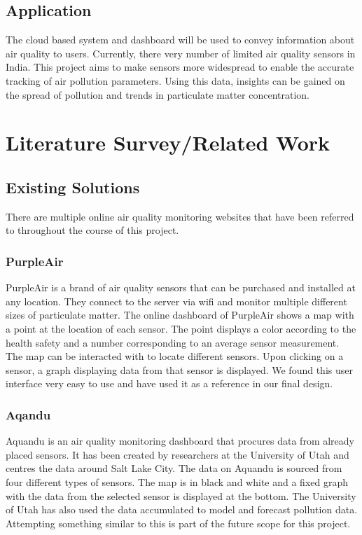 \documentclass[]{report}
\begin{document}
\section{Application}
The cloud based system and dashboard will be used to convey information about air quality to users. Currently, there very number of limited air quality sensors in India. This project aims to make sensors more widespread to enable the accurate tracking of air pollution parameters. Using this data, insights can be gained on the spread of pollution and trends in particulate matter concentration.

 

\chapter{Literature Survey/Related Work} 

\section{Existing Solutions}
There are multiple online air quality monitoring websites that have been referred to throughout the course of this project.

\subsection{PurpleAir}
PurpleAir\cite{purpleair} is a brand of air quality sensors that can be purchased and installed at any location. They connect to the server via wifi and monitor multiple different sizes of particulate matter. The online dashboard of PurpleAir shows a map with a point at the location of each sensor. The point displays a color according to the health safety and a number corresponding to an average sensor measurement. The map can be interacted with to locate different sensors. Upon clicking on a sensor, a graph displaying data from that sensor is displayed. We found this user interface very easy to use and have used it as a reference in our final design.

\subsection{Aqandu}
Aquandu\cite{aqandu} is an air quality monitoring dashboard that procures data from already placed sensors. It has been created by researchers at the University of Utah and centres the data around Salt Lake City. The data on Aquandu is sourced from four different types of sensors. The map is in black and white and a fixed graph with the data from the selected sensor is displayed at the bottom. The University of Utah has also used the data accumulated to model and forecast pollution data.\cite{aqandu:mlvideo} Attempting something similar to this is part of the future scope for this project.
\end{document}
